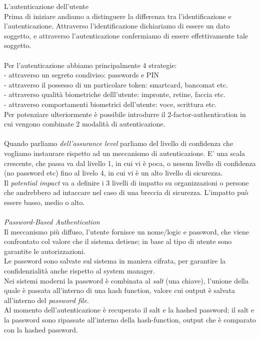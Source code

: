 \documentclass[11pt, oneside]{article}   	%
\begin{document}
L'autenticazione dell'utente\\
Prima di iniziare andiamo a distinguere la differenza tra l'identificazione e l'autenticazione. Attraverso l'identificazione dichiariamo di essere un dato soggetto, e attraverso l'autenticazione confermiamo di essere effettivamente tale soggetto.\\\\
Per l'autenticazione abbiamo principalmente 4 strategie:\\
- attraverso un segreto condiviso: passwords e PIN\\
- attraverso il possesso di un particolare token: smartcard, bancomat etc.\\
- attraverso qualità biometriche delll'utente: impronte, retine, faccia etc.\\
- attraverso comportamenti biometrici dell'utente: voce, scrittura etc.\\
Per potenziare ulteriormente è possibile introdurre il 2-factor-authentication in cui vengono combinate 2 modalità di autenticazione.\\\\
Quando parliamo \emph{dell'assurance level} parliamo del livello di confidenza che vogliamo instaurare rispetto ad un meccanismo di autenticazione. E' una scala crescente, che passa va dal livello 1, in cui vi è poca, o nessun livello di confidenza (no password etc) fino al livelo 4, in cui vi è un alto livello di sicurezza.\\
Il \emph{potential impact} va a definire i 3 livelli di impatto su organizzazioni o persone che andrebbero ad intaccare nel caso di una breccia di sicurezza. L'impatto può essere basso, medio o alto.\\\\
\emph{Password-Based Authentication}\\
Il meccanismo più diffuso, l'utente fornisce un nome/logic e password, che viene confrontato col valore che il sistema detiene; in base al tipo di utente sono garantite le autorizzazioni.\\
 Le password sono salvate sul sistema in maniera cifrata, per garantire la confidenzialità anche rispetto al system manager. \\Nei sistemi moderni la password è combinata al \emph{salt} (una chiave), l'unione della quale è passata all'interno di una hash function, valore cui output è salvata all'interno del \emph{password file}.\\
 Al momento dell'autenticazione è recuperato il salt e la hashed password; il salt e la password sono ripassate all'interno della hash-function, output che è comparato con la hashed password.
\end{document}
